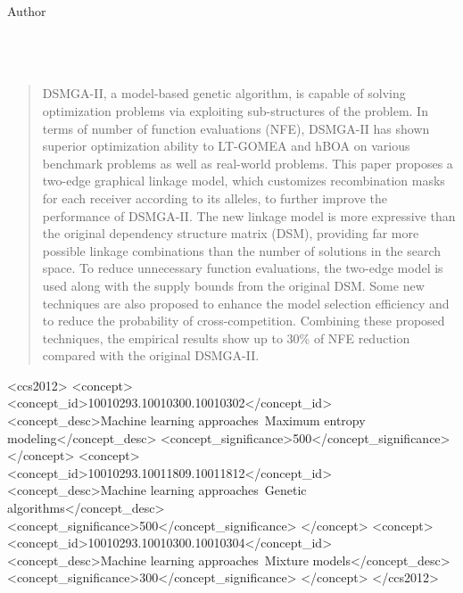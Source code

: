 \documentclass{sig-alternate-05-2015}
\begin{document}
{%
\alignauthor
Author\\
       \\
       \\
       \\
}


\maketitle
\begin{abstract}
DSMGA-II, a model-based genetic algorithm, is capable of solving optimization problems via exploiting sub-structures of the problem. In terms of number of function evaluations (NFE), DSMGA-II has shown superior optimization ability to LT-GOMEA and hBOA on various benchmark problems as well as real-world problems. This paper proposes a two-edge graphical linkage model, which customizes recombination masks for each receiver according to its alleles, to further improve the performance of DSMGA-II.  The new linkage model is more expressive than the original dependency structure matrix (DSM), providing far more possible linkage combinations than the number of solutions in the search space. To reduce unnecessary function evaluations, the two-edge model is used along with the supply bounds from the original DSM. Some new techniques are also proposed to enhance the model selection efficiency and to reduce the probability of cross-competition. Combining these proposed techniques, the empirical results show up to 30\% of NFE reduction compared with the original DSMGA-II.
\end{abstract}


%
%
\begin{CCSXML}
<ccs2012>
<concept>
<concept_id>10010293.10010300.10010302</concept_id>
<concept_desc>Machine learning approaches~Maximum entropy modeling</concept_desc>
<concept_significance>500</concept_significance>
</concept>
<concept>
<concept_id>10010293.10011809.10011812</concept_id>
<concept_desc>Machine learning approaches~Genetic algorithms</concept_desc>
<concept_significance>500</concept_significance>
</concept>
<concept>
<concept_id>10010293.10010300.10010304</concept_id>
<concept_desc>Machine learning approaches~Mixture models</concept_desc>
<concept_significance>300</concept_significance>
</concept>
</ccs2012>
\end{CCSXML}
\end{document}
